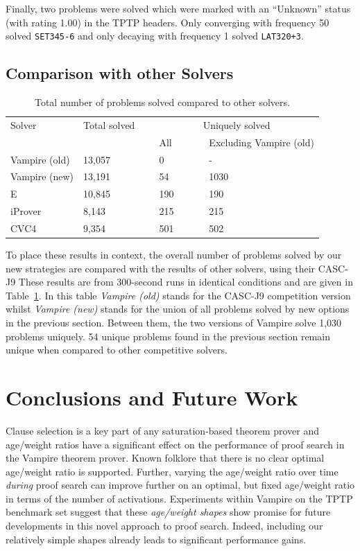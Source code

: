\documentclass{llncs}
\begin{document}
Finally, two problems were solved which were marked with an ``Unknown'' status (with rating 1.00) in the TPTP headers.
Only converging with frequency 50 solved \texttt{SET345-6} and only decaying with frequency 1 solved \texttt{LAT320+3}.

\subsection{Comparison with other Solvers}

\begin{table}[t]
	\caption{
Total number of problems solved compared to other solvers.
}
	\centering
	\begin{tabular}{l l l l}
	Solver~~ & Total solved~~~ & \multicolumn{2}{c}{Uniquely solved}  \\
	& & All ~~~~~& Excluding Vampire (old) \\
	\hline
	Vampire (old)	& 13,057 & 0 & -\\
	Vampire (new)   & 13,191 & 54 & 1030\\
	E 		& 10,845 & 190 & 190\\
	iProver		& 8,143 & 215 & 215\\
	CVC4		& 9,354 & 501 & 502\\
	\end{tabular}
	\label{tab:other}
\end{table}

To place these results in context, the overall number of problems solved by our new strategies are compared with the results of other solvers, using their CASC-J9
These results are from 300-second runs in identical conditions and are given in Table~\ref{tab:other}.
In this table \emph{Vampire (old)} stands for the CASC-J9 competition version whilst \emph{Vampire (new)} stands for the union of all problems solved by new options in the previous section.
Between them, the two versions of Vampire solve 1,030 problems uniquely.
54 unique problems found in the previous section remain unique when compared to other competitive solvers.

\section{Conclusions and Future Work}
\label{sec:conclusions}

Clause selection is a key part of any saturation-based theorem prover and age/weight ratios have a significant effect on the performance of proof search in the Vampire theorem prover.
Known folklore that there is no clear optimal age/weight ratio is supported.
Further, varying the age/weight ratio over time \emph{during} proof search can improve further on an optimal, but fixed age/weight ratio in terms of the number of activations.
Experiments within Vampire on the TPTP benchmark set suggest that these \emph{age/weight shapes} show promise for future developments in this novel approach to proof search. Indeed, including our relatively simple shapes already leads to significant performance gains.
\end{document}
